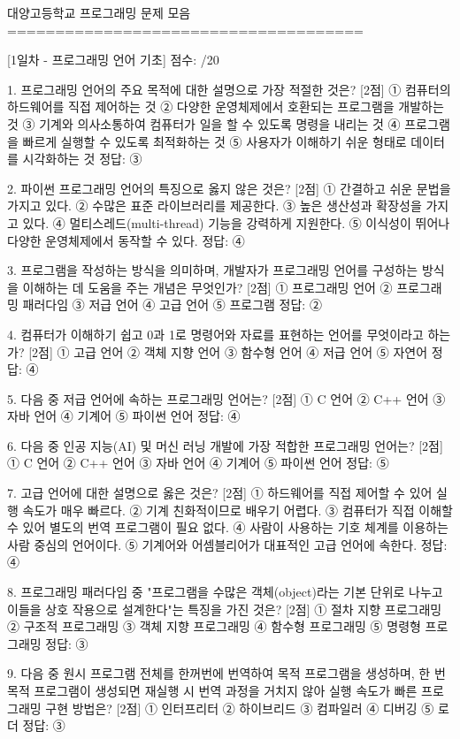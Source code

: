 대양고등학교 프로그래밍 문제 모음
=====================================

[1일차 - 프로그래밍 언어 기초]
점수: /20

1. 프로그래밍 언어의 주요 목적에 대한 설명으로 가장 적절한 것은? [2점]
① 컴퓨터의 하드웨어를 직접 제어하는 것
② 다양한 운영체제에서 호환되는 프로그램을 개발하는 것
③ 기계와 의사소통하여 컴퓨터가 일을 할 수 있도록 명령을 내리는 것
④ 프로그램을 빠르게 실행할 수 있도록 최적화하는 것
⑤ 사용자가 이해하기 쉬운 형태로 데이터를 시각화하는 것
정답: ③

2. 파이썬 프로그래밍 언어의 특징으로 옳지 않은 것은? [2점]
① 간결하고 쉬운 문법을 가지고 있다.
② 수많은 표준 라이브러리를 제공한다.
③ 높은 생산성과 확장성을 가지고 있다.
④ 멀티스레드(multi-thread) 기능을 강력하게 지원한다.
⑤ 이식성이 뛰어나 다양한 운영체제에서 동작할 수 있다.
정답: ④

3. 프로그램을 작성하는 방식을 의미하며, 개발자가 프로그래밍 언어를 구성하는 방식을 이해하는 데 도움을 주는 개념은 무엇인가? [2점]
① 프로그래밍 언어
② 프로그래밍 패러다임
③ 저급 언어
④ 고급 언어
⑤ 프로그램
정답: ②

4. 컴퓨터가 이해하기 쉽고 0과 1로 명령어와 자료를 표현하는 언어를 무엇이라고 하는가? [2점]
① 고급 언어
② 객체 지향 언어
③ 함수형 언어
④ 저급 언어
⑤ 자연어
정답: ④

5. 다음 중 저급 언어에 속하는 프로그래밍 언어는? [2점]
① C 언어
② C++ 언어
③ 자바 언어
④ 기계어
⑤ 파이썬 언어
정답: ④

6. 다음 중 인공 지능(AI) 및 머신 러닝 개발에 가장 적합한 프로그래밍 언어는? [2점]
① C 언어
② C++ 언어
③ 자바 언어
④ 기계어
⑤ 파이썬 언어
정답: ⑤

7. 고급 언어에 대한 설명으로 옳은 것은? [2점]
① 하드웨어를 직접 제어할 수 있어 실행 속도가 매우 빠르다.
② 기계 친화적이므로 배우기 어렵다.
③ 컴퓨터가 직접 이해할 수 있어 별도의 번역 프로그램이 필요 없다.
④ 사람이 사용하는 기호 체계를 이용하는 사람 중심의 언어이다.
⑤ 기계어와 어셈블리어가 대표적인 고급 언어에 속한다.
정답: ④

8. 프로그래밍 패러다임 중 "프로그램을 수많은 객체(object)라는 기본 단위로 나누고 이들을 상호 작용으로 설계한다"는 특징을 가진 것은? [2점]
① 절차 지향 프로그래밍
② 구조적 프로그래밍
③ 객체 지향 프로그래밍
④ 함수형 프로그래밍
⑤ 명령형 프로그래밍
정답: ③

9. 다음 중 원시 프로그램 전체를 한꺼번에 번역하여 목적 프로그램을 생성하며, 한 번 목적 프로그램이 생성되면 재실행 시 번역 과정을 거치지 않아 실행 속도가 빠른 프로그래밍 구현 방법은? [2점]
① 인터프리터
② 하이브리드
③ 컴파일러
④ 디버깅
⑤ 로더
정답: ③

